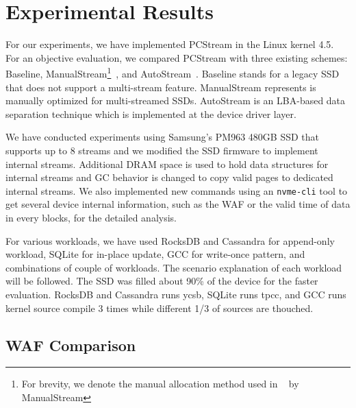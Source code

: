 \section{Experimental Results}

For our experiments, we have implemented \textsf{\small PCStream} in the Linux kernel
4.5.  For an objective evaluation, we compared \textsf{\small PCStream} with three
existing schemes: \textsf{\small Baseline}, \textsf{\small ManualStream}\footnote{For brevity, 
we denote the manual allocation method used in ~\cite{MultiStream} by 
\textsf{\small ManualStream}}~\cite{MultiStream}, and
\textsf{\small AutoStream}~\cite{AutoStream}.  \textsf{\small Baseline} stands for a legacy
SSD that does not support a multi-stream feature. \textsf{\small ManualStream} represents
is manually optimized for multi-streamed SSDs.
\textsf{\small AutoStream} is an LBA-based data separation technique which is
implemented at the device driver layer. 

We have conducted experiments using Samsung's PM963 480GB SSD 
that supports up to 8 streams
and we modified the SSD firmware to implement internal streams.
Additional DRAM space is used to hold data structures for internal streams 
and GC behavior is changed to copy valid pages to dedicated internal streams.
We also implemented new commands using an \texttt{nvme-cli} tool to get several 
device internal information, such as the WAF or the valid time of data in every blocks, 
for the detailed analysis.

For various workloads, we have used RocksDB and Cassandra for append-only workload,
SQLite for in-place update, GCC for write-once pattern, and combinations of couple 
of workloads.
The scenario explanation of each workload will be followed.
The SSD was filled about 90\% of the device for the faster evaluation.
RocksDB and Cassandra runs ycsb, SQLite runs tpcc, and GCC runs kernel source
compile 3 times while different 1/3 of sources are thouched.



\subsection{WAF Comparison}

